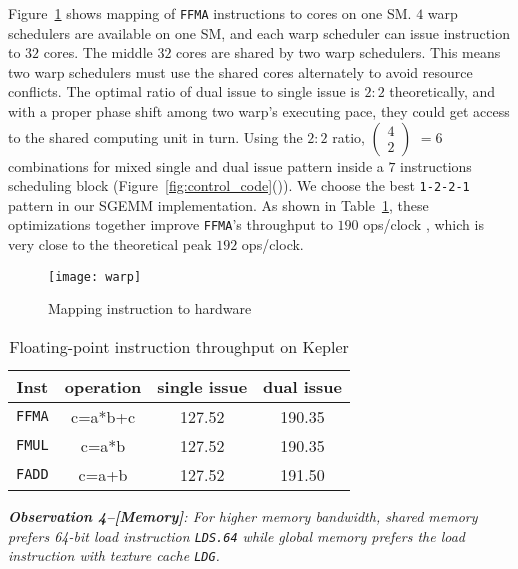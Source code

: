 Figure~\ref{fig:warp} shows mapping of {\tt FFMA} instructions to cores on one SM. $4$ warp schedulers are available on
one SM, and each warp scheduler can issue instruction to $32$ cores. The middle $32$ cores are shared by two warp
schedulers. This means two warp schedulers must use the shared cores alternately to avoid resource conflicts.
The optimal ratio of dual issue to single issue is $2:2$ theoretically, and
with a proper phase shift among two warp's executing pace, they could get access to the shared computing unit in turn.
Using the $2:2$ ratio, \( \begin{pmatrix} 4 \\ 2 \end{pmatrix} \) $=6$ combinations for mixed single and dual issue
pattern inside a $7$ instructions scheduling block (Figure~\ref{fig:control_code}()).
We choose the best {\tt 1-2-2-1} pattern in our SGEMM implementation.
As shown in Table~\ref{tab:ffma}, these optimizations together improve {\tt FFMA}'s throughput to $190$ ops/clock
, which is very close to the theoretical peak $192$ ops/clock.
\begin{figure}[htbp]
\begin{center}
\texttt{[image: warp]}
    \caption{Mapping instruction to hardware}
\label{fig:warp}
\end{center}
\end{figure}

\begin{table}[htbp]
\caption{Floating-point instruction throughput on Kepler}
\centering
\scalebox{0.9} {
\begin{tabular}{|c|c|c|c|}
\hline
Inst &operation&single issue&dual issue\\
\hline
{\tt FFMA} &c=a*b+c&127.52&190.35 \\
\hline
{\tt FMUL} &c=a*b&127.52&190.35 \\
\hline
{\tt FADD} &c=a+b&127.52&191.50\\
\hline
\end{tabular}
}
\label{tab:ffma}
\end{table}

{\em {\bf Observation 4--[Memory]}: For higher memory bandwidth, shared memory prefers 64-bit load
instruction {\tt LDS.64} while global memory prefers the load instruction with texture cache {\tt LDG}.}

